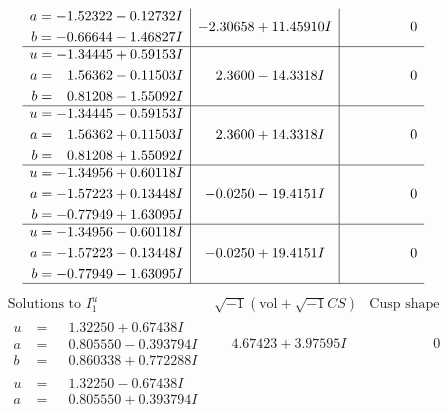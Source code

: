 \documentclass[1p]{elsarticle_modified}
\theoremstyle{definition}
\newcommand{\I}{\sqrt{-1}}
\begin{document}
$$\begin{array}{c|c|c}
\begin{aligned}
a &= -1.52322 - 0.12732 I \\
b &= -0.66644 - 1.46827 I\end{aligned}
 & -2.30658 + 11.45910 I & \phantom{-0.000000 } 0 \\ \hline\begin{aligned}
u &= -1.34445 + 0.59153 I \\
a &= \phantom{-}1.56362 - 0.11503 I \\
b &= \phantom{-}0.81208 - 1.55092 I\end{aligned}
 & \phantom{-}2.3600 - 14.3318 I & \phantom{-0.000000 } 0 \\ \hline\begin{aligned}
u &= -1.34445 - 0.59153 I \\
a &= \phantom{-}1.56362 + 0.11503 I \\
b &= \phantom{-}0.81208 + 1.55092 I\end{aligned}
 & \phantom{-}2.3600 + 14.3318 I & \phantom{-0.000000 } 0 \\ \hline\begin{aligned}
u &= -1.34956 + 0.60118 I \\
a &= -1.57223 + 0.13448 I \\
b &= -0.77949 + 1.63095 I\end{aligned}
 & -0.0250 - 19.4151 I & \phantom{-0.000000 } 0 \\ \hline\begin{aligned}
u &= -1.34956 - 0.60118 I \\
a &= -1.57223 - 0.13448 I \\
b &= -0.77949 - 1.63095 I\end{aligned}
 & -0.0250 + 19.4151 I & \phantom{-0.000000 } 0\\
 \hline 
 \end{array}$$\newpage$$\begin{array}{c|c|c}  
\text{Solutions to }I^u_{1}& \I (\text{vol} + \sqrt{-1}CS) & \text{Cusp shape}\\
 \hline 
\begin{aligned}
u &= \phantom{-}1.32250 + 0.67438 I \\
a &= \phantom{-}0.805550 - 0.393794 I \\
b &= \phantom{-}0.860338 + 0.772288 I\end{aligned}
 & \phantom{-}4.67423 + 3.97595 I & \phantom{-0.000000 } 0 \\ \hline\begin{aligned}
u &= \phantom{-}1.32250 - 0.67438 I \\
a &= \phantom{-}0.805550 + 0.393794 I \\

\end{aligned}
\end{array}$$
\end{document}
